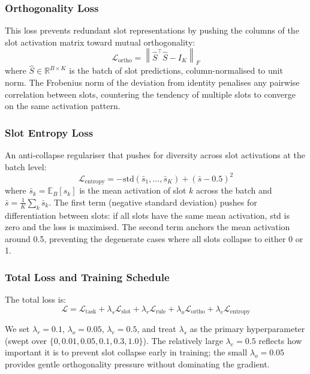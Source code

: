 \documentclass[conference]{IEEEtran}
\newcommand{\Real}{\mathbb{R}}
\begin{document}
\subsubsection{Orthogonality Loss}
This loss prevents redundant slot representations by pushing the
columns of the slot activation matrix toward mutual orthogonality:
\begin{equation}
    \mathcal{L}_\text{ortho} = \left\|
    \hat{S}^\top \hat{S} - I_K
    \right\|_F
\end{equation}
where $\hat{S} \in \Real^{B \times K}$ is the batch of slot
predictions, column-normalised to unit norm. The Frobenius norm
of the deviation from identity penalises any pairwise correlation
between slots, countering the tendency of multiple slots to
converge on the same activation pattern.

\subsubsection{Slot Entropy Loss}
An anti-collapse regulariser that pushes for diversity across
slot activations at the batch level:
\begin{equation}
    \mathcal{L}_\text{entropy} = -\mathrm{std}(\bar{s}_1, \dots, \bar{s}_K)
    + (\bar{s} - 0.5)^2
\end{equation}
where $\bar{s}_k = \mathbb{E}_B[s_k]$ is the mean activation of
slot $k$ across the batch and $\bar{s} = \frac{1}{K}\sum_k \bar{s}_k$.
The first term (negative standard deviation) pushes for
differentiation between slots: if all slots have the same mean
activation, std is zero and the loss is maximised. The second
term anchors the mean activation around 0.5, preventing the
degenerate cases where all slots collapse to either 0 or 1.

\subsubsection{Total Loss and Training Schedule}
The total loss is:
\begin{equation}
    \mathcal{L} = \mathcal{L}_\text{task}
    + \lambda_s \mathcal{L}_\text{slot}
    + \lambda_r \mathcal{L}_\text{rule}
    + \lambda_o \mathcal{L}_\text{ortho}
    + \lambda_e \mathcal{L}_\text{entropy}
\label{eq:total_loss}
\end{equation}

We set $\lambda_r = 0.1$, $\lambda_o = 0.05$, $\lambda_e = 0.5$,
and treat $\lambda_s$ as the primary hyperparameter (swept over
$\{0, 0.01, 0.05, 0.1, 0.3, 1.0\}$). The relatively large
$\lambda_e = 0.5$ reflects how important it is to prevent slot
collapse early in training; the small $\lambda_o = 0.05$ provides
gentle orthogonality pressure without dominating the gradient.
\end{document}

